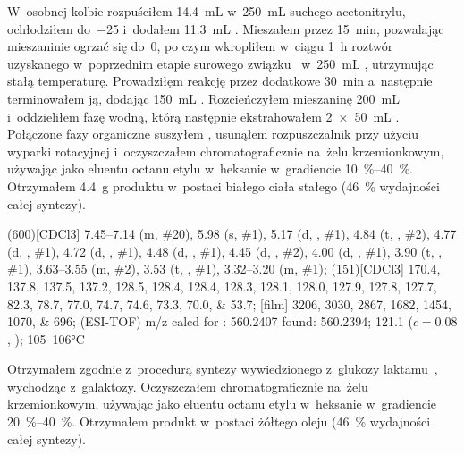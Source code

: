 W~osobnej kolbie rozpuściłem \SI{14.4}{\mL}  w~\SI{250}{\mL} suchego acetonitrylu,
	ochłodziłem do~\SI{-25}{\degC} i~dodałem \SI{11.3}{\mL} .
Mieszałem przez \SI{15}{\minute}, pozwalając mieszaninie ogrzać się do~\SI{0}{\degC},
	po czym wkropliłem w~ciągu \SI{1}{\hour} roztwór uzyskanego w~poprzednim etapie surowego
	związku~ w~\SI{250}{\mL} , utrzymując stałą temperaturę.
Prowadziłęm reakcję przez dodatkowe \SI{30}{\minute} a~następnie terminowałem ją, dodając
	\SI{150}{\mL} .
Rozcieńczyłem mieszaninę \SI{200}{\mL}  i~oddzieliłem fazę wodną, którą następnie
	ekstrahowałem \SI[product-units = single]{2 x 50}{\mL} .
Połączone fazy organiczne suszyłem , usunąłem rozpuszczalnik przy użyciu wyparki
	rotacyjnej i~oczyszczałem chromatograficznie na~żelu krzemionkowym,
	używając jako eluentu octanu etylu w~heksanie w~gradiencie \SIrange{10}{40}{\percent}.
Otrzymałem \SI{4.4}{\gram} produktu w~postaci białego ciała stałego
	(\SI{46}{\percent} wydajności całej syntezy).

\begin{fullexp}
  \NMR(600)[CDCl3] \numrange{7.45}{7.14} (m, \#{20}), \num{5.98} (s, \#{1}), \num{5.17} (d, , \#{1}), \num{4.84} (t, , \#{2}), \num{4.77} (d, , \#{1}), \num{4.72} (d, , \#{1}), \num{4.48} (d, , \#{1}), \num{4.45} (d, , \#{2}), \num{4.00} (d, , \#{1}), \num{3.90} (t, , \#{1}), \numrange{3.63}{3.55} (m, \#{2}), \num{3.53} (t, , \#{1}), \numrange{3.32}{3.20} (m, \#{1}); 
  (151)[CDCl3] \numlist{170.4; 137.8; 137.5; 137.2; 128.5; 128.4; 128.4; 128.3; 128.1; 128.0; 127.9; 127.8; 127.7; 82.3; 78.7; 77.0; 74.7; 74.6; 73.3; 70.0; 53.7}; 
  [film] \numlist{3206; 3030; 2867; 1682; 1454; 1070; 696}; 
   (ESI-TOF) m/z calcd for : \num{560.2407} found: \num{560.2394};
  \data{[$\alpha^{23}_D$]~$=$} \num{121.1} ($c = 0.08$, ); 
   \numrange{105}{106}\si{\celsius}
\end{fullexp}

Otrzymałem zgodnie z~\hyperref[syn:glu-lactam]{procedurą syntezy wywiedzionego z~glukozy
  laktamu~}, wychodząc z~galaktozy.
Oczyszczałem chromatograficznie na~żelu krzemionkowym,
	używając jako eluentu octanu etylu w~heksanie w~gradiencie \SIrange{20}{40}{\percent}.
Otrzymałem produkt w~postaci żółtego oleju (\SI{46}{\percent} wydajności całej syntezy).

